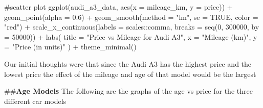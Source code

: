 \documentclass[
  letterpaper,
  DIV=11,
  numbers=noendperiod]{scrartcl}
\newenvironment{Shaded}{\begin{snugshade}}{\end{snugshade}}
\newcommand{\AttributeTok}[1]{\textcolor[rgb]{0.40,0.45,0.13}{#1}}
\newcommand{\CommentTok}[1]{\textcolor[rgb]{0.37,0.37,0.37}{#1}}
\newcommand{\ConstantTok}[1]{\textcolor[rgb]{0.56,0.35,0.01}{#1}}
\newcommand{\DecValTok}[1]{\textcolor[rgb]{0.68,0.00,0.00}{#1}}
\newcommand{\FloatTok}[1]{\textcolor[rgb]{0.68,0.00,0.00}{#1}}
\newcommand{\FunctionTok}[1]{\textcolor[rgb]{0.28,0.35,0.67}{#1}}
\newcommand{\NormalTok}[1]{\textcolor[rgb]{0.00,0.23,0.31}{#1}}
\newcommand{\SpecialCharTok}[1]{\textcolor[rgb]{0.37,0.37,0.37}{#1}}
\newcommand{\StringTok}[1]{\textcolor[rgb]{0.13,0.47,0.30}{#1}}
\begin{document}
\begin{Shaded}
\begin{Highlighting}[]
\CommentTok{\#scatter plot}
\FunctionTok{ggplot}\NormalTok{(audi\_a3\_data, }\FunctionTok{aes}\NormalTok{(}\AttributeTok{x =}\NormalTok{ mileage\_km, }\AttributeTok{y =}\NormalTok{ price)) }\SpecialCharTok{+}
  \FunctionTok{geom\_point}\NormalTok{(}\AttributeTok{alpha =} \FloatTok{0.6}\NormalTok{) }\SpecialCharTok{+}
  \FunctionTok{geom\_smooth}\NormalTok{(}\AttributeTok{method =} \StringTok{"lm"}\NormalTok{, }\AttributeTok{se =} \ConstantTok{TRUE}\NormalTok{, }\AttributeTok{color =} \StringTok{"red"}\NormalTok{) }\SpecialCharTok{+}
  \FunctionTok{scale\_x\_continuous}\NormalTok{(}\AttributeTok{labels =}\NormalTok{ scales}\SpecialCharTok{::}\NormalTok{comma, }\AttributeTok{breaks =} \FunctionTok{seq}\NormalTok{(}\DecValTok{0}\NormalTok{, }\DecValTok{300000}\NormalTok{, }\AttributeTok{by =} \DecValTok{50000}\NormalTok{)) }\SpecialCharTok{+}
  \FunctionTok{labs}\NormalTok{(}
    \AttributeTok{title =} \StringTok{"Price vs Mileage for Audi A3"}\NormalTok{,}
    \AttributeTok{x =} \StringTok{"Mileage (km)"}\NormalTok{,}
    \AttributeTok{y =} \StringTok{"Price (in units)"}
\NormalTok{  ) }\SpecialCharTok{+}
  \FunctionTok{theme\_minimal}\NormalTok{()}
\end{Highlighting}
\end{Shaded}

Our initial thoughts were that since the Audi A3 has the highest price
and the lowest price the effect of the mileage and age of that model
would be the largest

\#\#\textbf{Age Models} The following are the graphs of the age vs price
for the three different car models
\end{document}
